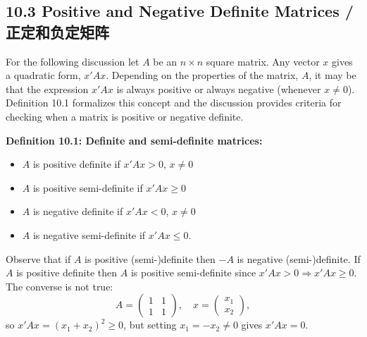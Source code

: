 \subsection{10.3 Positive and Negative Definite Matrices / 正定和负定矩阵}

\begin{original}
For the following discussion let $A$ be an $n \times n$ square matrix. Any vector $x$ gives a quadratic form, $x'Ax$. Depending on the properties of the matrix, $A$, it may be that the expression $x'Ax$ is always positive or always negative (whenever $x \neq 0$). Definition 10.1 formalizes this concept and the discussion provides criteria for checking when a matrix is positive or negative definite.

\textbf{Definition 10.1: Definite and semi-definite matrices:}
\begin{itemize}
\item $A$ is positive definite if $x'Ax > 0$, $x \neq 0$
\item $A$ is positive semi-definite if $x'Ax \geq 0$
\item $A$ is negative definite if $x'Ax < 0$, $x \neq 0$
\item $A$ is negative semi-definite if $x'Ax \leq 0$.
\end{itemize}

Observe that if $A$ is positive (semi-)definite then $-A$ is negative (semi-)definite. If $A$ is positive definite then $A$ is positive semi-definite since $x'Ax > 0 \Rightarrow x'Ax \geq 0$. The converse is not true:
\[
A = \begin{pmatrix} 1 & 1 \\ 1 & 1 \end{pmatrix}, \quad x = \begin{pmatrix} x_1 \\ x_2 \end{pmatrix},
\]
so $x'Ax = (x_1 + x_2)^2 \geq 0$, but setting $x_1 = -x_2 \neq 0$ gives $x'Ax = 0$.
\end{original}

